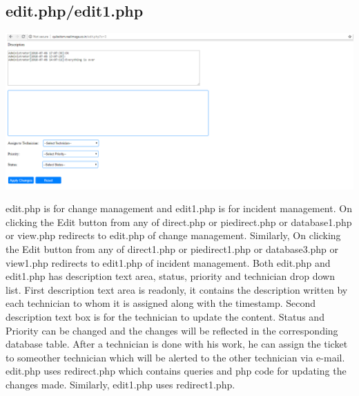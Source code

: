 \documentclass{article}
\begin{document}
\subsection{edit.php/edit1.php}
\begin{center}

    \includegraphics[width=7.0in]{edit.png}
   
    \label{}

\end{center}
edit.php is for change management and edit1.php is for incident management. On clicking the Edit button from any of direct.php or piedirect.php or database1.php or view.php redirects to edit.php of change management. Similarly, On clicking the Edit button from any of direct1.php or piedirect1.php or database3.php or view1.php redirects to edit1.php of incident management. Both edit.php and edit1.php has description text area, status, priority and technician drop down list.
First description text area is readonly, it contains the description written by each technician to whom it is assigned along with the timestamp. Second description text box is for the technician to update the content. Status and Priority can be changed and the changes will be reflected in the corresponding database table. After a technician is done with his work, he can assign the ticket to someother technician which will be alerted to the other technician via e-mail. edit.php uses redirect.php which contains queries and php code for updating the changes made. Similarly, edit1.php uses redirect1.php.
\end{document}

